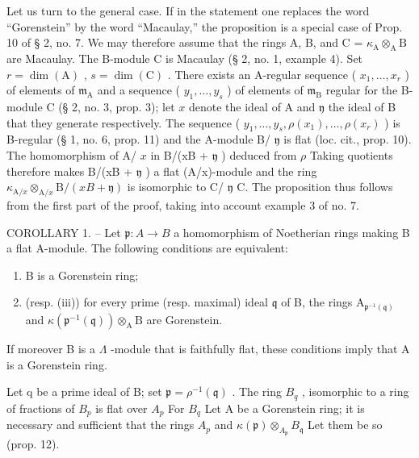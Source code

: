 Let us turn to the general case. If in the statement one replaces the word “Gorenstein” by the word “Macaulay,” the proposition is a special case of Prop. 10 of § 2, no. 7. We may therefore assume that the rings A, B, and C = \(\kappa_{\mathrm{A}} \otimes_{\mathrm{A}} \mathrm{B}\) are Macaulay. The B-module C is Macaulay (§ 2, no. 1, example 4). Set \(r = \dim(\mathrm{A})\) , \(s = \dim(\mathrm{C})\) . There exists an A-regular sequence ( \(x_1, \ldots, x_r\) ) of elements of \(\mathfrak{m}_{\mathrm{A}}\) and a sequence ( \(y_1, \ldots, y_s\) ) of elements of \(\mathfrak{m}_{\mathrm{B}}\) regular for the B-module C (§ 2, no. 3, prop. 3); let \(x\) denote the ideal of A and \(\mathfrak{y}\) the ideal of B that they generate respectively. The sequence ( \(y_1, \ldots, y_s, \rho(x_1), \ldots, \rho(x_r)\) ) is B-regular (§ 1, no. 6, prop. 11) and the A-module B/ \(\mathfrak{y}\) is flat (loc. cit., prop. 10). The homomorphism of A/ \(x\) in B/(xB + \(\mathfrak{y}\) ) deduced from \(\rho\) Taking quotients therefore makes B/(xB + \(\mathfrak{y}\) ) a flat (A/x)-module and the ring \(\kappa_{\mathrm{A}/x} \otimes_{\mathrm{A}/x} \mathrm{B}/(xB + \mathfrak{y})\) is isomorphic to C/ \(\mathfrak{y}\) C. The proposition thus follows from the first part of the proof, taking into account example 3 of no. 7.

COROLLARY 1. -- Let \(\mathfrak{p}: A \to B\) a homomorphism of Noetherian rings making B a flat A-module. The following conditions are equivalent:

\begin{enumerate}
\def\labelenumi{(\roman{enumi})}
\item
  B is a Gorenstein ring;
\item
  (resp. (iii)) for every prime (resp. maximal) ideal \(\mathfrak{q}\) of B, the rings \(\mathrm{A}_{\mathfrak{p}^{-1}(\mathfrak{q})}\) and \(\kappa (\mathfrak{p}^{-1}(\mathfrak{q}))\otimes_{\mathrm{A}}\mathrm{B}\) are Gorenstein.
\end{enumerate}

If moreover B is a \(\Lambda\) -module that is faithfully flat, these conditions imply that A is a Gorenstein ring.

Let q be a prime ideal of B; set \(\mathfrak{p} = \rho^{-1}(\mathfrak{q})\) . The ring \(B_{q}\) , isomorphic to a ring of fractions of \(B_{p}\) is flat over \(A_{p}\) For \(B_{q}\) Let A be a Gorenstein ring; it is necessary and sufficient that the rings \(A_{p}\) and \(\kappa(\mathfrak{p}) \otimes_{A_{\mathfrak{p}}} B_{\mathfrak{q}}\) Let them be so (prop. 12).

